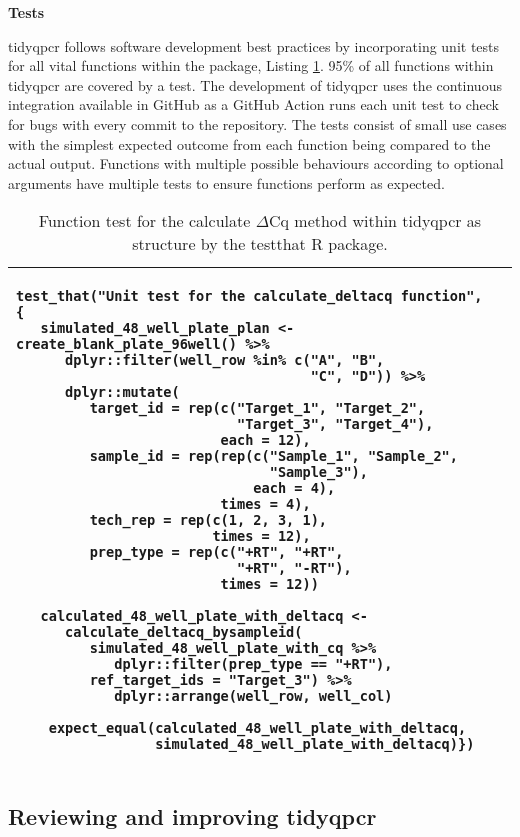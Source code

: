 \documentclass[../main.tex]{subfiles}
\begin{document}
\newpage
\textbf{Tests}

tidyqpcr follows software development best practices by incorporating unit tests for all vital functions within the package, Listing \ref{function-tests}. 
95\% of all functions within tidyqpcr are covered by a test. 
The development of tidyqpcr uses the continuous integration available in GitHub as a GitHub Action runs each unit test to check for bugs with every commit to the repository. 
The tests consist of small use cases with the simplest expected outcome from each function being compared to the actual output. 
Functions with multiple possible behaviours according to optional arguments have multiple tests to ensure functions perform as expected. 

\begin{table}
\centering
\begin{tabular}{| m{10cm} |}
\hline
\begin{lstlisting}[style=mystyle]
test_that("Unit test for the calculate_deltacq function",
{
   simulated_48_well_plate_plan <- create_blank_plate_96well() %>%
      dplyr::filter(well_row %in% c("A", "B",
                                    "C", "D")) %>%
      dplyr::mutate(
         target_id = rep(c("Target_1", "Target_2",
                           "Target_3", "Target_4"),
                         each = 12),
         sample_id = rep(rep(c("Sample_1", "Sample_2",
                               "Sample_3"),
                             each = 4),
                         times = 4),
         tech_rep = rep(c(1, 2, 3, 1),
                        times = 12),
         prep_type = rep(c("+RT", "+RT",
                           "+RT", "-RT"),
                         times = 12))

   calculated_48_well_plate_with_deltacq <- 
      calculate_deltacq_bysampleid(
         simulated_48_well_plate_with_cq %>%
            dplyr::filter(prep_type == "+RT"), 
         ref_target_ids = "Target_3") %>%
            dplyr::arrange(well_row, well_col)

    expect_equal(calculated_48_well_plate_with_deltacq,        
                 simulated_48_well_plate_with_deltacq)})
\end{lstlisting} \\
\hline
\end{tabular}
\caption{Function test for the calculate $\Delta$Cq method within tidyqpcr as structure by the testthat R package.}
\label{function-tests}
\end{table}

\subsection{Reviewing and improving tidyqpcr}
\end{document}
